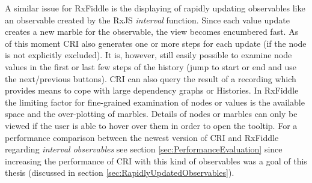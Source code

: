 	A similar issue for RxFiddle is the displaying of rapidly updating observables like an observable created by the RxJS \emph{interval} function. Since each value update creates a new marble for the observable, the view becomes encumbered fast. As of this moment CRI also generates one or more steps for each update (if the node is not explicitly excluded). It is, however, still easily possible to examine node values in the first or last few steps of the history (jump to start or end and use the next/previous buttons). CRI can also query the result of a recording which provides means to cope with large dependency graphs or Histories. In RxFiddle the limiting factor for  fine-grained examination of nodes or values is the available space and the over-plotting of marbles. Details of nodes or marbles can only be viewed if the user is able to hover over them in order to open the tooltip. For a performance comparison between the newest version of CRI and RxFiddle regarding \emph{interval observables} see section \ref{sec:PerformanceEvaluation} since increasing the performance of CRI with this kind of observables was a goal of this thesis (discussed in section \ref{sec:RapidlyUpdatedObservables}). %
